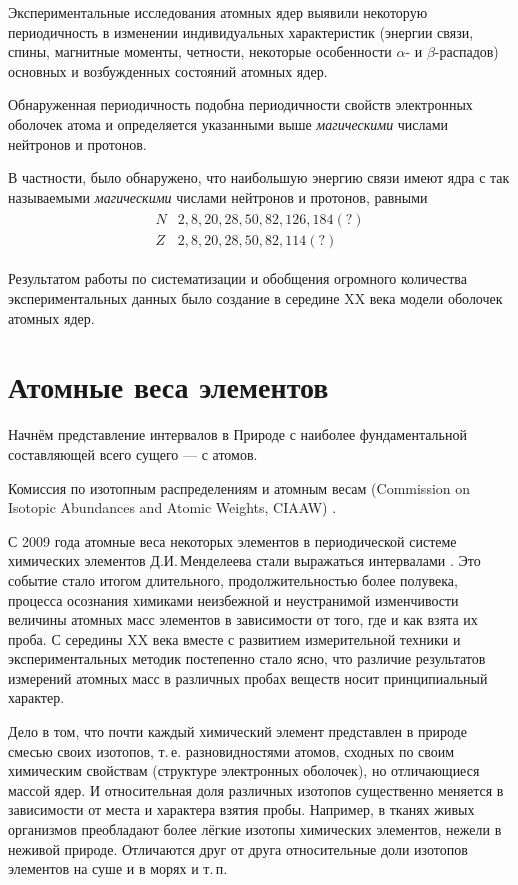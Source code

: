 \documentclass[a5paper,openany]{book}
\begin{document}
Экспериментальные исследования атомных ядер выявили некоторую периодичность в изменении
индивидуальных характеристик (энергии связи, спины, магнитные моменты, четности, некоторые
особенности $\alpha$- и $\beta$-распадов) основных и возбужденных состояний атомных ядер. 

Обнаруженная периодичность подобна периодичности свойств электронных оболочек атома и определяется указанными выше \emph{магическими} числами нейтронов и протонов.

В частности, было обнаружено, что наибольшую энергию связи имеют ядра с так называемыми \emph{магическими} числами нейтронов и протонов, равными 
\begin{align*}
\begin{array}{cl}
N & 2, 8, 20, 28, 50, 82, 126, 184(?) \\
Z & 2, 8, 20, 28, 50, 82, 114(?)
\end{array}
\end{align*}

Результатом работы по систематизации и обобщения огромного
количества экспериментальных данных было создание в середине XX века
модели оболочек атомных ядер.  

\section{Атомные веса элементов}

Начнём представление интервалов в Природе с наиболее фундаментальной составляющей всего сущего --- с атомов.

Комиссия по изотопным распределениям и атомным весам (Commission on Isotopic Abundances and Atomic Weights, CIAAW) \cite{CIAAW}.

С 2009 года атомные веса некоторых элементов в периодической системе химических 
элементов Д.И.\,Менделеева стали выражаться интервалами \cite{IUPAC}. Это событие 
стало итогом длительного, продолжительностью более полувека, процесса осознания 
химиками неизбежной и неустранимой изменчивости величины атомных масс элементов 
в зависимости от того, где и как взята их проба. С середины XX века вместе 
с развитием измерительной техники и экспериментальных методик постепенно стало ясно, 
что различие результатов измерений атомных масс в различных пробах веществ носит 
принципиальный характер. 

Дело в том, что почти каждый химический элемент представлен в природе смесью своих 
изотопов, т.\,е. разновидностями атомов, сходных по своим химическим свойствам 
(структуре электронных оболочек), но отличающиеся массой ядер. И относительная 
доля различных изотопов существенно меняется в зависимости от места и характера 
взятия пробы. Например, в тканях живых организмов преобладают более лёгкие изотопы 
химических элементов, нежели в неживой природе. Отличаются друг от друга 
относительные доли изотопов элементов на суше и в морях и т.\,п. 
\end{document}

